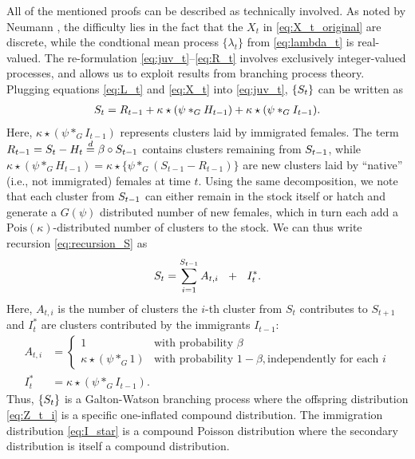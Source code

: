 \documentclass[review]{elsarticle}
\begin{document}
All of the mentioned proofs can be described as technically involved. As noted by Neumann \cite{Neumann2011}, the difficulty lies in the fact that the $X_t$ in \eqref{eq:X_t_original} are discrete, while the condtional mean process $\{\lambda_t\}$ from \eqref{eq:lambda_t} is real-valued. The re-formulation \eqref{eq:juv_t}--\eqref{eq:R_t} involves exclusively integer-valued processes, and allows us to exploit results from branching process theory. Plugging equations \eqref{eq:L_t} and \eqref{eq:X_t} into \eqref{eq:juv_t}, $\{S_t\}$ can be written as
\begin{align}
S_t = R_{t - 1} + \kappa \star (\psi *_G H_{t - 1}) + \kappa \star (\psi *_G I_{t - 1}). \label{eq:recursion_S}
\end{align}
Here, $\kappa \star (\psi *_G I_{t - 1})$ represents clusters laid by immigrated females. The term  $R_{t - 1} = S_t - H_t \stackrel{d}{=} \beta \circ S_{t - 1}$ contains clusters remaining from $ S_{t - 1}$, while $\kappa \star (\psi *_G H_{t - 1}) = \kappa \star \{\psi *_G (S_{t - 1} - R_{t - 1})\}$ are new clusters laid by ``native'' (i.e., not immigrated) females at time $t$. Using the same decomposition, we note that each cluster from $S_{t - 1}$ can either remain in the stock itself or hatch and generate a $G(\psi)$ distributed number of new females, which in turn each add a $\text{Pois}(\kappa)$-distributed number of clusters to the stock. We can thus write recursion \eqref{eq:recursion_S} as
$$
\juv_t = \sum_{i = 1}^{\juv_{t - 1}} A_{t, i} \ \ + \ \ I^*_t.
$$
Here, $A_{t, i}$ is the number of clusters the $i$-th cluster from $S_t$ contributes to $S_{t + 1}$ and $I^*_t$ are clusters contributed by the immigrants $I_{t - 1}$:
\begin{align}
A_{t, i} & = \begin{cases}
1 & \text{with probability } \beta\\
\kappa \star (\psi *_G 1) & \text{with probability } 1 - \beta, \text{independently for each } i
\label{eq:Z_t_i}
\end{cases}\\
I^*_t & = \kappa\star (\psi *_G I_{t - 1}). \label{eq:I_star}
\end{align}
Thus, $\{S_t\}$ is a Galton-Watson branching process where the offspring distribution \eqref{eq:Z_t_i} is a specific one-inflated compound distribution. %
The immigration distribution \eqref{eq:I_star} is a compound Poisson distribution where the secondary distribution is itself a compound distribution. %
\end{document}
